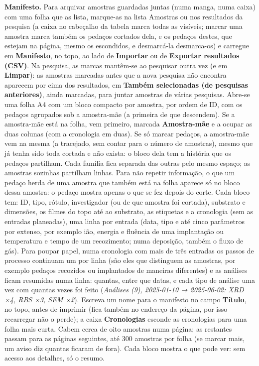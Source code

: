 \documentclass[11pt,a4paper]{article}
\newcommand{\ui}[1]{\textsf{\textbf{#1}}}
\newcommand{\menu}[1]{\textsf{#1}}
\begin{document}
\textbf{Manifesto.} Para arquivar amostras guardadas juntas (numa manga,
numa caixa) com uma folha que as lista, marque-as na lista \menu{Amostras} ou nos resultados da pesquisa
(a caixa no cabeçalho da tabela marca todas as visíveis; marcar uma amostra
marca também os pedaços cortados dela, e os pedaços destes, que estejam na
página, mesmo os escondidos, e desmarcá-la desmarca-os) e carregue em
\ui{Manifesto}, no topo, ao lado de \ui{Importar} ou de
\ui{Exportar resultados (CSV)}. Na pesquisa, as marcas mantêm-se ao pesquisar
outra vez (e em \ui{Limpar}): as amostras marcadas antes que a nova pesquisa não
encontra aparecem por cima dos resultados, em \ui{Também selecionadas (de
pesquisas anteriores)}, ainda marcadas, para juntar amostras de várias pesquisas. Abre-se uma folha A4 com um bloco
compacto por amostra, por ordem de ID, com os pedaços agrupados sob a
amostra-mãe (a primeira de que descendem). Se a amostra-mãe está na folha, vem
primeiro, marcada \ui{Amostra-mãe} e a ocupar as duas colunas (com a cronologia
em duas). Se só marcar pedaços, a amostra-mãe vem na mesma (a tracejado, sem contar
para o número de amostras), mesmo que já tenha sido toda cortada e não exista: o bloco dela
tem a história que os pedaços partilham. Cada família fica separada das outras pelo mesmo espaço; as amostras
sozinhas partilham linhas. Para não repetir informação, o que um pedaço herda de uma
amostra que também está na folha aparece só no bloco dessa amostra: o pedaço
mostra apenas o que se fez depois do corte. Cada bloco tem: ID, tipo, rótulo, investigador (ou de
que amostra foi cortada), substrato e dimensões, os filmes do topo até ao
substrato, as etiquetas e a cronologia (sem as entradas planeadas), uma linha por entrada (data, tipo e até cinco
parâmetros por extenso, por exemplo ião, energia e fluência de uma implantação ou
temperatura e tempo de um recozimento; numa deposição, também o fluxo de gás). Para
poupar papel, numa cronologia com mais de três entradas os passos de processo continuam
um por linha (são eles que distinguem as amostras, por exemplo pedaços recozidos ou
implantados de maneiras diferentes) e as análises ficam resumidas numa linha: quantas,
entre que datas, e cada tipo de análise uma vez com quantas vezes foi feito
(\emph{Análises (9), 2025-01-10 → 2025-06-02: XRD ×4, RBS ×3, SEM ×2}). Escreva um nome para o manifesto no campo
\ui{Título}, no topo, antes de imprimir (fica também no endereço da página, por isso
recarregar não o perde); a
caixa \ui{Cronologias} esconde as cronologias para uma folha mais curta.
Cabem cerca de oito amostras numa página; as restantes passam para as páginas
seguintes, até 300 amostras por folha (se marcar mais, um aviso diz quantas ficaram de fora). Cada bloco mostra o que pode ver:
sem acesso aos detalhes, só o resumo.
\end{document}
